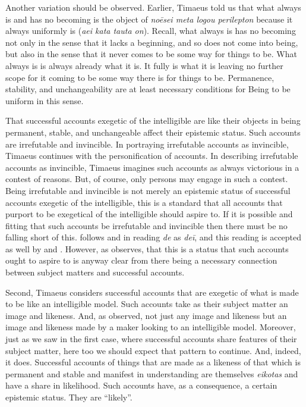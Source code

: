 Another variation should be observed. Earlier, Timaeus told us that what always is and has no becoming is the object of \emph{noēsei meta logou perilepton} because it always uniformly is (\emph{aei kata tauta on}). Recall, what always is has no becoming not only in the sense that it lacks a beginning, and so does not come into being, but also in the sense that it never comes to be some way for things to be. What always is is always already what it is. It fully is what it is leaving no further scope for it coming to be some way there is for things to be. Permanence, stability, and unchangeability are at least necessary conditions for Being to be uniform in this sense.

That successful accounts exegetic of the intelligible are like their objects in being permanent, stable, and unchangeable affect their epistemic status. Such accounts are irrefutable and invincible. In portraying irrefutable accounts as invincible, Timaeus continues with the personification of accounts. In describing irrefutable accounts as invincible, Timaeus imagines such accounts as always victorious in a contest of reasons. But, of course, only persons may engage in such a contest. Being irrefutable and invincible is not merely an epistemic status of successful accounts exegetic of the intelligible, this is a standard that all accounts that purport to be exegetical of the intelligible should aspire to. If it is possible and fitting that such accounts be irrefutable and invincible then there must be no falling short of this. \citet[150]{Burnyeat:2005it} follows \citet[88]{Archer-Hind:1888qd} and \citet{Burnet:1905oq} in reading \emph{de} as \emph{deī}, and this reading is accepted as well by \citet[74]{Taylor:1928qb} and \citet[52]{Bury:1929jb}. However, as \citet[121 n22]{Bryan:2012bt} observes, that this is a status that such accounts ought to aspire to is anyway clear from there being a necessary connection between subject matters and successful accounts. 

Second, Timaeus considers successful accounts that are exegetic of what is made to be like an intelligible model. Such accounts take as their subject matter an image and likeness. And, as \citet[]{Betegh:2010aa} observed, not just any image and likeness but an image and likeness made by a maker looking to an intelligible model. Moreover, just as we saw in the first case, where successful accounts share features of their subject matter, here too we should expect that pattern to continue. And, indeed, it does. Successful accounts of things that are made as a likeness of that which is permanent and stable and manifest in understanding are themselves \emph{eikotas} and have a share in likelihood. Such accounts have, as a consequence, a certain epistemic status. They are ``likely''. 

